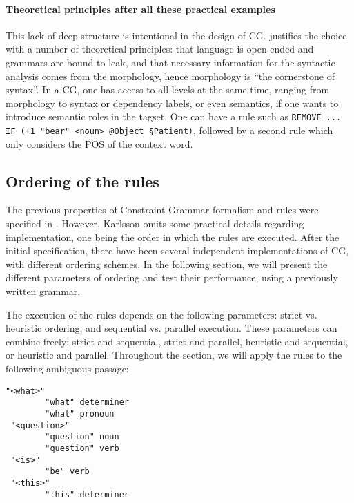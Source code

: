 \paragraph{Theoretical principles after all these practical examples} This lack of deep structure is intentional in the design of CG.
\cite{karlsson1995constraint} justifies the choice with a number of
theoretical principles: that language is open-ended and grammars are
bound to leak, and that necessary information for the syntactic analysis
comes from the morphology, hence morphology is ``the cornerstone of
syntax''. In a CG, one has access to all levels at the same time,
ranging from morphology to syntax or dependency labels, or even
semantics, if one wants to introduce semantic roles in the
tagset. One can have a rule such as \texttt{REMOVE ... IF (+1 "bear" <noun>
  @Object §Patient)}, followed by a second rule which only considers the POS of the
context word.

\subsection*{Ordering of the rules}\label{ordering}

The previous properties of Constraint Grammar formalism and rules were specified in \cite{karlsson1995constraint}. However, Karlsson omits some practical details regarding implementation, one being the order in which the rules are executed. After the initial specification, there have been several independent implementations of CG, with different ordering schemes. In the following section, we will present the different parameters of ordering and test their performance, using a previously written grammar.

The execution of the rules depends on the following parameters: strict vs. heuristic ordering, and sequential vs. parallel execution. These parameters can combine freely: strict and sequential, strict and parallel, heuristic and sequential, or heuristic and parallel. Throughout the section, we will apply the rules to the following ambiguous passage:
\begin{verbatim}
"<what>"
        "what" determiner
        "what" pronoun                                        
 "<question>"
        "question" noun
        "question" verb
 "<is>"
        "be" verb
 "<this>"
        "this" determiner
\end{verbatim}


